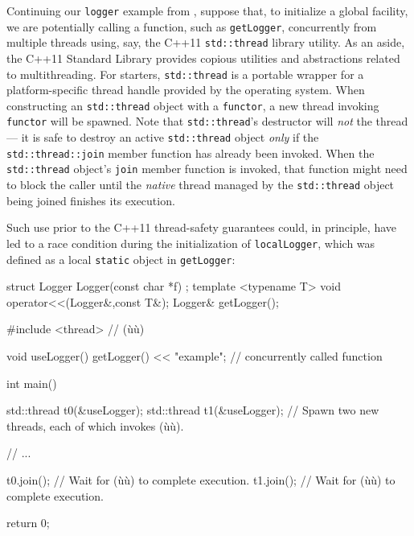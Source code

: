 \noindent Continuing our \lstinline!logger! example from , suppose that, to initialize a global
facility, we are potentially calling a function, such as
\lstinline!getLogger!, concurrently from multiple threads using, say, the
C++11 \lstinline!std::thread! library utility. As an aside, the C++11
Standard Library provides copious utilities and abstractions related
to multithreading. For starters, \lstinline!std::thread! is a portable
wrapper for a platform-specific thread handle provided by the
operating system. When constructing an \lstinline!std::thread! object
with a  \lstinline!functor!, a new thread
invoking \lstinline!functor! will be spawned. Note that
\lstinline!std::thread!'s destructor will \emph{not}  the
thread --- it is safe to destroy an active \lstinline!std::thread! object
\emph{only} if the \lstinline!std::thread::join! member function has
already been invoked. When the \lstinline!std::thread! object's
\lstinline!join! member function is invoked, that function might need to
block the caller until the \emph{native} thread managed by the
  \lstinline!std::thread! object being joined finishes its execution.

Such use prior to the C++11 thread-safety guarantees could, in
principle, have led to a race condition during the initialization of
\lstinline!localLogger!, which was defined as a local \lstinline!static!
object in \lstinline!getLogger!:

\begin{emcppshiddenlisting}[emcppsbatch={e6,e15}]
struct Logger {
  Logger(const char *f) {}
};
template <typename T>
void operator<<(Logger&,const T&);
Logger& getLogger();
\end{emcppshiddenlisting}
\begin{emcppslisting}[emcppsbatch=e6]
#include <thread>  // (ù{}ù)

void useLogger() { getLogger() << "example"; }  // concurrently called function

int main()
{
    std::thread t0(&useLogger);
    std::thread t1(&useLogger);
        // Spawn two new threads, each of which invokes (ù{}ù).

    // ...

    t0.join();  // Wait for (ù{}ù) to complete execution.
    t1.join();  // Wait for (ù{}ù) to complete execution.

    return 0;
}
\end{emcppslisting}

